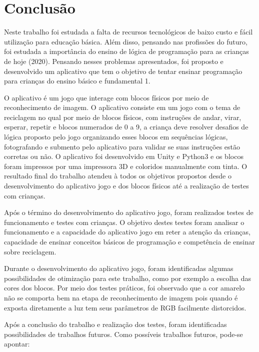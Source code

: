 \chapter{Conclusão}\label{cap:conclusão}

Neste trabalho foi estudada a falta de recursos tecnológicos de baixo custo e fácil utilização para educação básica. Além disso, pensando nas profissões do futuro, foi estudada a importância do ensino de lógica de programação para as crianças de hoje (2020).
Pensando nesses problemas apresentados, foi proposto e desenvolvido um aplicativo que tem o objetivo de tentar ensinar programação para crianças do ensino básico e fundamental 1. 

O aplicativo é um jogo que interage com blocos físicos por meio de reconhecimento de imagem. O aplicativo consiste em um jogo com o tema de reciclagem no qual por meio de blocos físicos, com instruções de andar, virar, esperar, repetir e blocos numerados de 0 a 9, a criança deve resolver desafios de lógica proposto pelo jogo organizando esses blocos em sequências lógicas, fotografando e submento pelo aplicativo para validar se suas instruções estão corretas ou não. O aplicativo foi desenvolvido em Unity e Python3 e os blocos foram impressos por uma impressora 3D e coloridos manualmente com tinta. O resultado final do trabalho atendeu à todos os objetivos propostos desde o desenvolvimento do aplicativo jogo e dos blocos físicos até a realização de testes com crianças.

Após o término do desenvolvimento do aplicativo jogo, foram realizados testes de funcionamento e testes com crianças. O objetivo destes testes foram analisar o funcionamento e a capacidade do aplicativo jogo em reter a atenção da crianças, capacidade de ensinar conceitos básicos de programação e competência de ensinar sobre reciclagem.

Durante o desenvolvimento do aplicativo jogo, foram identificadas algumas possibilidades de otimização para este trabalho, como por exemplo a escolha das cores dos blocos. Por meio dos testes práticos, foi observado que a cor amarelo não se comporta bem na etapa de reconhecimento de imagem pois quando é exposta diretamente a luz tem seus parâmetros de RGB facilmente distorcidos.

Após a conclusão do trabalho e realização dos testes, foram identificadas possibilidades de trabalhos futuros. Como possíveis trabalhos futuros, pode-se apontar:

